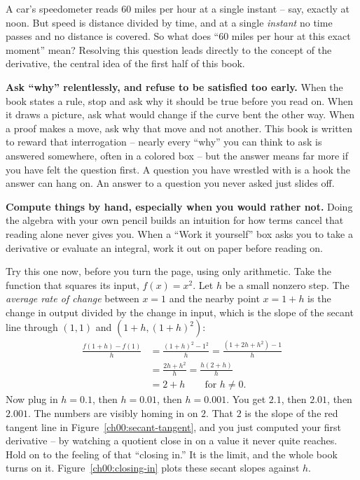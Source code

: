\begin{walkbox}
A car's speedometer reads
$60$ miles per hour at a single instant -- say, exactly at noon. But speed is distance divided by
time, and at a single \emph{instant} no time passes and no distance is covered. So what does
``$60$ miles per hour at this exact moment'' mean? Resolving this question leads directly to the concept of the derivative,
the central idea of the first half of this book.
\end{walkbox}

\textbf{Ask ``why'' relentlessly, and refuse to be satisfied too early.} When the book states a rule,
stop and ask why it should be true before you read on. When it draws a picture, ask what would change
if the curve bent the other way. When a proof makes a move, ask why that move and not another. This
book is written to reward that interrogation -- nearly every ``why'' you can think to ask is answered
somewhere, often in a colored box -- but the answer means far more if you have felt the question
first. A question you have wrestled with is a hook the answer can hang on. An answer to a
question you never asked just slides off.

\textbf{Compute things by hand, especially when you would rather not.} Doing the algebra with your own pencil builds an intuition for how terms cancel that reading alone never gives you. When a ``Work it yourself'' box asks you to take a derivative or evaluate an
integral, work it out on paper before reading on.

\begin{labbox}
Try this one now, before you turn the page, using only arithmetic. Take the function that
squares its input, $f(x)=x^2$. Let $h$ be a small nonzero step. The \emph{average rate of change}
between $x=1$ and the nearby point $x=1+h$ is the change in output divided by the change in input,
which is the slope of the secant line through $(1,1)$ and $(1+h,(1+h)^2)$:
\[
\begin{aligned}
\frac{f(1+h)-f(1)}{h} &= \frac{(1+h)^2-1^2}{h} = \frac{(1+2h+h^2)-1}{h} \\
&= \frac{2h+h^2}{h} = \frac{h(2+h)}{h} \\
&= 2+h \qquad \text{for } h \neq 0.
\end{aligned}
\]
Now plug in $h=0.1$, then $h=0.01$, then $h=0.001$. You get $2.1$, then $2.01$, then $2.001$. The
numbers are visibly homing in on $2$. That $2$ is the slope of the red tangent line in
Figure~\ref{ch00:secant-tangent}, and you just computed your first derivative -- by watching a quotient
close in on a value it never quite reaches. Hold on to the feeling of that ``closing in.'' It is the
limit, and the whole book turns on it. Figure~\ref{ch00:closing-in} plots these secant slopes
against $h$.
\end{labbox}

